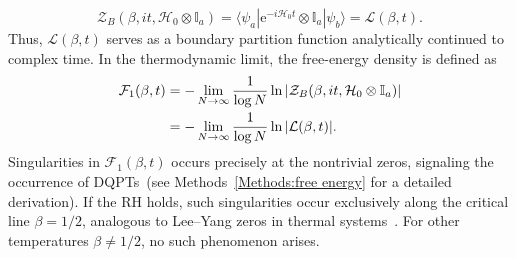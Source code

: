 \documentclass[aps,pra,twocolumn,superscriptaddress,preprintnumbers,amsmath,amssymb]{revtex4-2}
\begin{document}
\begin{equation}\label{eq:ZL}
    \mathcal{Z}_{B} ( \beta,it,\mathcal{H}_0\otimes \mathbb{I}_a)= \langle \psi_a | \mathrm{e}^{-i \mathcal{H}_0 t}\otimes \mathbb{I}_a | \psi_b \rangle=\mathcal{L}(\beta,t).
\end{equation}
Thus, $\mathcal{L}(\beta,t)$ serves as a boundary partition function analytically continued to complex time. %
In the thermodynamic limit, the free-energy density is defined as~\cite{heyl2013dynamical,peng2015experimental,francis2021many}
\begin{align}\label{eq:free} \mathcal{F}_1(\beta,t) &= - \lim_{N \to \infty} \frac{1}{\log N} \ln |\mathcal{Z}_{B}( \beta,it,\mathcal{H}_0\otimes \mathbb{I}_a)|\notag \\
&=- \lim_{N \to \infty} \frac{1}{\log N} \ln |\mathcal{L}( \beta,t)|.
\end{align}
Singularities in $\mathcal{F}_1(\beta,t)$ occurs precisely at the nontrivial zeros, signaling the occurrence of DQPTs~(see Methods~\ref{Methods:free energy} for a detailed derivation).
If the RH holds, such singularities occur exclusively along the critical line $\beta =1/2$, 
analogous to Lee–Yang zeros in thermal systems~\cite{wei2012lee, peng2015experimental,francis2021many}.
For other temperatures $\beta \neq 1/2$, no such phenomenon arises.
\end{document}

